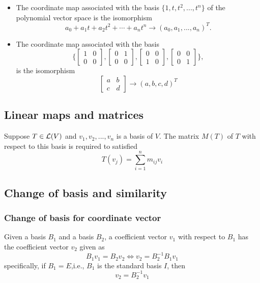 \begin{refsection}
\begin{example}\hfill
\begin{itemize}
	\item The coordinate map associated with the basis $\{1,t,t^2,...,t^n\}$ of the polynomial vector space is the isomorphism
	$$a_0+a_1t+a_2t^2 + \cdots + a_nt^n \to (a_0,a_1,...,a_n)^T.$$	
	\item The coordinate map associated with the basis
	$$\{\begin{bmatrix}
	1&0\\
	0&0
	\end{bmatrix},\begin{bmatrix}
	0&1\\
	0&0
	\end{bmatrix},\begin{bmatrix}
	0&0\\
	1&0
	\end{bmatrix},\begin{bmatrix}
	0&0\\
	0&1
	\end{bmatrix}\},$$
	is the isomorphism
	$$\begin{bmatrix}
	a&b\\
	c&d
	\end{bmatrix} \to (a,b,c,d)^T$$
	
\end{itemize}	

\end{example}


\subsection{Linear maps and matrices}

\begin{lemma}
\cite[146]{axler2015linear} Suppose $T\in \mathcal{L}(V)$ and $v_1,v_2,...,v_n$ is a basis of $V$. The matrix $M(T)$ of $T$ with respect to this basis is required to satisfied
$$T(v_j) = \sum_{i=1}^n m_{ij}v_i $$
\end{lemma}


\subsection{Change of basis and similarity}
\subsubsection{Change of basis for coordinate vector}
\begin{lemma}
Given a basis $B_1$ and a basis $B_2$, a coefficient vector $v_1$ with respect to $B_1$ has the coefficient vector $v_2$ given as 
$$B_1v_1 = B_2v_2 \Leftrightarrow v_2 = B_2^{-1}B_1v_1$$
specifically, if $B_1 = E$,i.e., $B_1$ is the standard basis $I$, then
$$v_2 = B_2^{-1}v_1$$
\end{lemma}


\end{refsection}

